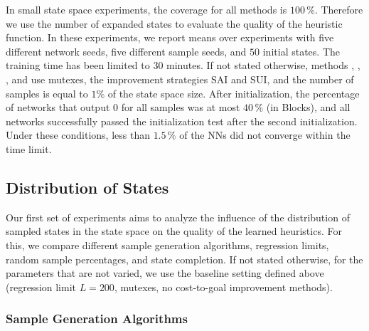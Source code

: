 

In small state space experiments, the coverage for all methods is $100\,\%$. Therefore we use the number of expanded states to evaluate the quality of the heuristic function. In these experiments, we report means over experiments with five different network seeds, five different sample seeds, and $50$ initial states. The training time has been limited to $30$ minutes. If not stated otherwise, methods \bfs, \dfs, \rw, and \bfsrw use mutexes, the improvement strategies SAI and SUI, and the number of samples is equal to $1\%$ of the state space size. After initialization, the percentage of networks that output $0$ for all samples was at most $40\,\%$ (in Blocks), and all networks successfully passed the initialization test after the second initialization. Under these conditions, less than $1.5\,\%$ of the NNs did not converge within the time limit.

\subsection{Distribution of States}
\label{sec:experiment1-subset}

Our first set of experiments aims to analyze the influence of the distribution of sampled states in the state space on the quality of the learned heuristics. For this, we compare different sample generation algorithms, regression limits, random sample percentages, and state completion. If not stated otherwise, for the parameters that are not varied, we use the baseline setting defined above (regression limit $L=200$,  mutexes, no cost-to-goal improvement methods).

\subsubsection{Sample Generation Algorithms}

